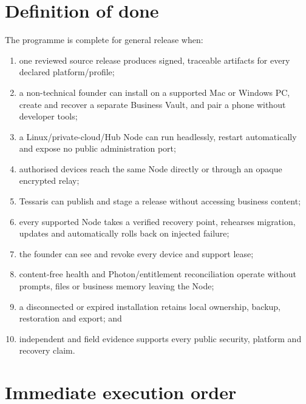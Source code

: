 \documentclass[11pt]{article}
\begin{document}
\section{Definition of done}

The programme is complete for general release when:

\begin{enumerate}
  \item one reviewed source release produces signed, traceable artifacts for every declared platform/profile;
  \item a non-technical founder can install on a supported Mac or Windows PC, create and recover a separate Business Vault, and pair a phone without developer tools;
  \item a Linux/private-cloud/Hub Node can run headlessly, restart automatically and expose no public administration port;
  \item authorised devices reach the same Node directly or through an opaque encrypted relay;
  \item Tessaris can publish and stage a release without accessing business content;
  \item every supported Node takes a verified recovery point, rehearses migration, updates and automatically rolls back on injected failure;
  \item the founder can see and revoke every device and support lease;
  \item content-free health and Photon/entitlement reconciliation operate without prompts, files or business memory leaving the Node;
  \item a disconnected or expired installation retains local ownership, backup, restoration and export; and
  \item independent and field evidence supports every public security, platform and recovery claim.
\end{enumerate}

\section{Immediate execution order}
\end{document}
